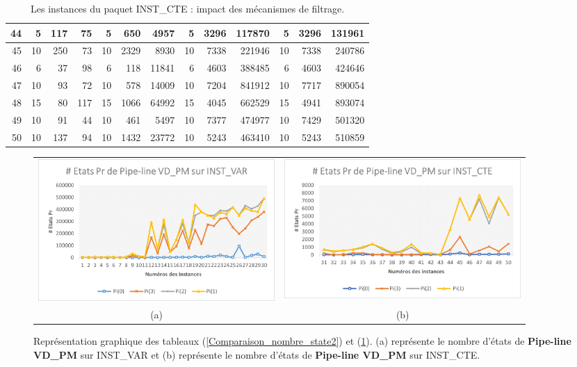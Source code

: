 \begin{table}[H]
\begin{tabular}{|r|rrr|rrr|rrr|rrr|}
		44	&	5	&	117	&	75	&	5	&	650	&	4957	&	5	&	3296	&	117870	&	5	&	3296	&	131961	\\ \hline
		45	&	10	&	250	&	73	&	10	&	2329	&	8930	&	10	&	7338	&	221946	&	10	&	7338	&	240786	\\ \hline
		46	&	6	&	37	&	98	&	6	&	118	&	11841	&	6	&	4603	&	388485	&	6	&	4603	&	424646	\\ \hline
		47	&	10	&	93	&	72	&	10	&	578	&	14009	&	10	&	7204	&	841912	&	10	&	7717	&	890054	\\ \hline
		48	&	15	&	80	&	117	&	15	&	1066	&	64992	&	15	&	4045	&	662529	&	15	&	4941	&	893074	\\ \hline
		49	&	10	&	91	&	44	&	10	&	461	&	5497	&	10	&	7377	&	474977	&	10	&	7429	&	501320	\\ \hline
		50	&	10	&	137	&	94	&	10	&	1432	&	23772	&	10	&	5243	&	463410	&	10	&	5243	&	510859	\\ \hline
		
		\bottomrule
	\end{tabular}%
	\caption{Les instances du paquet INST\_CTE : impact des mécanismes de filtrage.}
	
	\label{Comparaison_nombre_state}%
\end{table}%
\begin{figure}[H]
	\centering
	\begin{tabular}{c c}
		\includegraphics[width=9cm]{images_these/Etat_Pipe_INST_VAR.pdf}&
		\includegraphics[width=9cm]{images_these/Etat_Pipe_INST_CTE.pdf}
		\\
		(a) & (b)
	\end{tabular}
	\caption[Représentation graphique du CPU et du gap du tableau (\ref{Comparaison_nombre_state2})]{Représentation graphique des tableaux (\ref{Comparaison_nombre_state2}) et (\ref{Comparaison_nombre_state}). (a) représente le nombre d'états de \textbf{Pipe-line VD\_PM} sur INST\_VAR et (b) représente le nombre d'états de \textbf{Pipe-line VD\_PM} sur INST\_CTE.}\label{gap_cpu_pipe_Etat_INST_VAR}
\end{figure}
